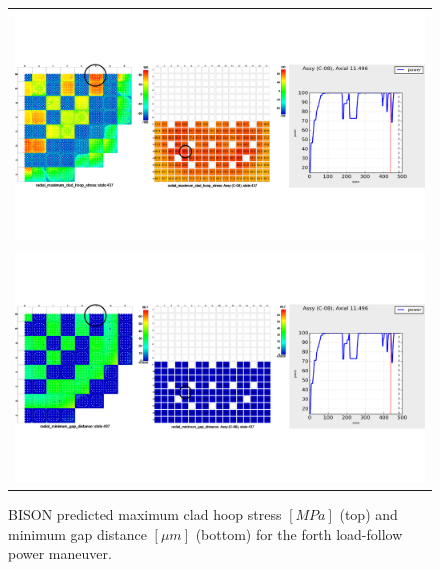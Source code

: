 \documentclass[edeposit,fullpage,11pt]{uiucthesis2009}
\begin{document}
\begin{landscape}
\begin{figure}[h]
\begin{tabular}{c}
\includegraphics[trim={0 4cm 0 4cm},clip,width=\linewidth]{./Figures/bison_res/PR4_MCHS.pdf} \\
\includegraphics[trim={0 4cm 0 4cm},clip,width=\linewidth]{./Figures/bison_res/PR4_MGD.pdf} \\
\end{tabular}
\caption{BISON predicted maximum clad hoop stress $[MPa]$ (top) and minimum gap distance $[ \mu m]$ (bottom) for the forth load-follow power maneuver.}
\label{fig:bison_PR4}
\end{figure}
\end{landscape}
\end{document}
